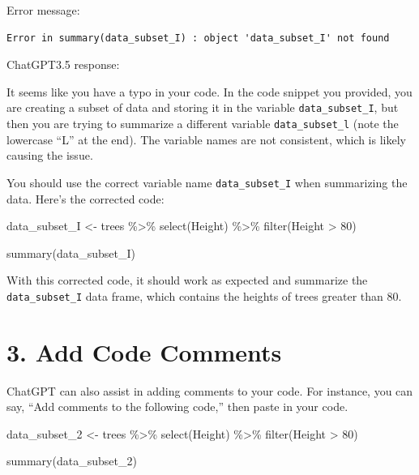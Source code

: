 \documentclass[
  letterpaper,
  DIV=11,
  numbers=noendperiod]{scrreprt}
\newenvironment{Shaded}{\begin{snugshade}}{\end{snugshade}}
\newcommand{\DecValTok}[1]{\textcolor[rgb]{0.68,0.00,0.00}{#1}}
\newcommand{\FunctionTok}[1]{\textcolor[rgb]{0.28,0.35,0.67}{#1}}
\newcommand{\NormalTok}[1]{\textcolor[rgb]{0.00,0.23,0.31}{#1}}
\newcommand{\OtherTok}[1]{\textcolor[rgb]{0.00,0.23,0.31}{#1}}
\newcommand{\SpecialCharTok}[1]{\textcolor[rgb]{0.37,0.37,0.37}{#1}}
\begin{document}
Error message:

\begin{verbatim}
Error in summary(data_subset_I) : object 'data_subset_I' not found
\end{verbatim}

ChatGPT3.5 response:

\leavevmode{}%
It seems like you have a typo in your code. In the code snippet you
provided, you are creating a subset of data and storing it in the
variable \texttt{data\_subset\_I}, but then you are trying to summarize
a different variable \texttt{data\_subset\_l} (note the lowercase ``L''
at the end). The variable names are not consistent, which is likely
causing the issue.

You should use the correct variable name \texttt{data\_subset\_I} when
summarizing the data. Here's the corrected code:

\begin{Shaded}
\begin{Highlighting}[]
\NormalTok{data\_subset\_I }\OtherTok{\textless{}{-}} 
\NormalTok{  trees }\SpecialCharTok{\%\textgreater{}\%}
  \FunctionTok{select}\NormalTok{(Height) }\SpecialCharTok{\%\textgreater{}\%} 
  \FunctionTok{filter}\NormalTok{(Height }\SpecialCharTok{\textgreater{}} \DecValTok{80}\NormalTok{)}

\FunctionTok{summary}\NormalTok{(data\_subset\_I)}
\end{Highlighting}
\end{Shaded}

With this corrected code, it should work as expected and summarize the
\texttt{data\_subset\_I} data frame, which contains the heights of trees
greater than 80.

\hypertarget{add-code-comments}{%
\section{3. Add Code Comments}\label{add-code-comments}}

ChatGPT can also assist in adding comments to your code. For instance,
you can say, ``Add comments to the following code,'' then paste in your
code.

\begin{Shaded}
\begin{Highlighting}[]
\NormalTok{data\_subset\_2 }\OtherTok{\textless{}{-}} 
\NormalTok{  trees }\SpecialCharTok{\%\textgreater{}\%}
  \FunctionTok{select}\NormalTok{(Height) }\SpecialCharTok{\%\textgreater{}\%} 
  \FunctionTok{filter}\NormalTok{(Height }\SpecialCharTok{\textgreater{}} \DecValTok{80}\NormalTok{)}

\FunctionTok{summary}\NormalTok{(data\_subset\_2)}
\end{Highlighting}
\end{Shaded}
\end{document}
